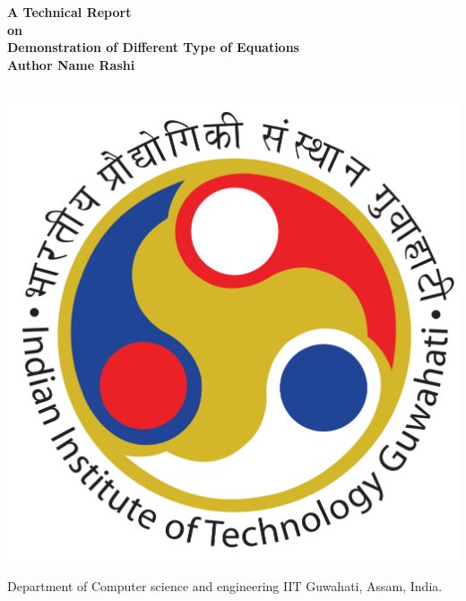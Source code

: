 \documentclass{report}
\begin{document}
	\begin{center}
	\begin{LARGE}\textbf{A Technical Report\\
		\vspace{1cm}
		on\\ \vspace{1.2cm}
		Demonstration of Different Type of Equations\\
		\vspace{2cm}
		Author Name Rashi	
}
	\end{LARGE}\\
	\vspace{3cm}
	\includegraphics[width=0.2\linewidth]{IITG-logo.png}\\
	\vspace{2cm}
	\begin{LARGE}
		Department of Computer science and engineering
		IIT Guwahati, Assam, India.
	\end{LARGE}
	\end{center}
	\vspace{6cm}
	\centering
\end{document}
